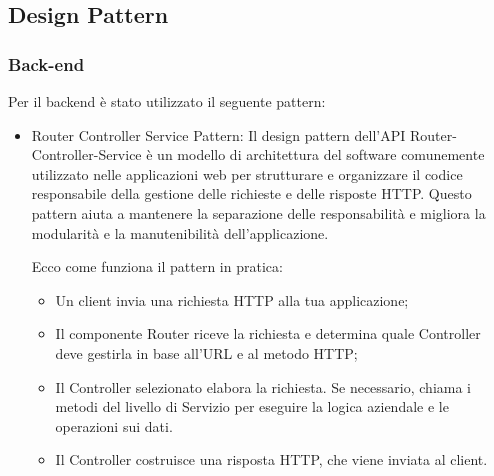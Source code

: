 \documentclass[12pt]{article}
\begin{document}
\subsection{Design Pattern}
\subsubsection{Back-end}
Per il backend è stato utilizzato il seguente pattern:
	\begin{itemize}
		\item Router Controller Service Pattern:
			Il design pattern dell'API Router-Controller-Service è un modello di architettura del software comunemente utilizzato nelle applicazioni web per strutturare e organizzare il codice responsabile della gestione delle richieste e delle risposte HTTP. Questo pattern aiuta a mantenere la separazione delle responsabilità e migliora la modularità e la manutenibilità dell'applicazione.

			Ecco come funziona il pattern in pratica:
			\begin{itemize}
				\item Un client invia una richiesta HTTP alla tua applicazione;
				\item Il componente Router riceve la richiesta e determina quale Controller deve gestirla in base all'URL e al metodo HTTP;
				\item Il Controller selezionato elabora la richiesta. Se necessario, chiama i metodi del livello di Servizio per eseguire la logica aziendale e le operazioni sui dati.
				\item Il Controller costruisce una risposta HTTP, che viene inviata al client.
			\end{itemize}

		
	\end{itemize}
\end{document}
